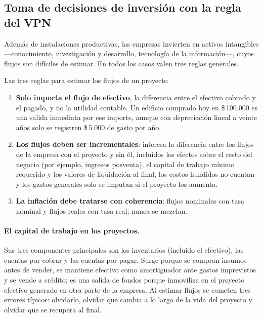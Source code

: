 \subsection{Toma de decisiones de inversión con la regla del VPN}

Además de instalaciones productivas, las empresas invierten en activos intangibles —conocimiento, investigación y desarrollo, tecnología de la información—, cuyos flujos son difíciles de estimar. En todos los casos valen tres reglas generales.

\begin{definicion}{Las tres reglas para estimar los flujos de un proyecto}
\begin{enumerate}
\item \textbf{Solo importa el flujo de efectivo}, la diferencia entre el efectivo cobrado y el pagado, y no la utilidad contable. Un edificio comprado hoy en \$\,100.000 es una salida inmediata por ese importe, aunque con depreciación lineal a veinte años solo se registren \$\,5.000 de gasto por año.
\item \textbf{Los flujos deben ser incrementales}: interesa la diferencia entre los flujos de la empresa con el proyecto y sin él, incluidos los efectos sobre el resto del negocio (por ejemplo, ingresos posventa), el capital de trabajo mínimo requerido y los valores de liquidación al final; los costos hundidos no cuentan y los gastos generales solo se imputan si el proyecto los aumenta.
\item \textbf{La inflación debe tratarse con coherencia}: flujos nominales con tasa nominal y flujos reales con tasa real; nunca se mezclan.
\end{enumerate}
\end{definicion}

\paragraph{El capital de trabajo en los proyectos.} Sus tres componentes principales son los inventarios (incluido el efectivo), las cuentas por cobrar y las cuentas por pagar. Surge porque se compran insumos antes de vender, se mantiene efectivo como amortiguador ante gastos imprevistos y se vende a crédito; es una salida de fondos porque inmoviliza en el proyecto efectivo generado en otra parte de la empresa. Al estimar flujos se cometen tres errores típicos: olvidarlo, olvidar que cambia a lo largo de la vida del proyecto y olvidar que se recupera al final.

